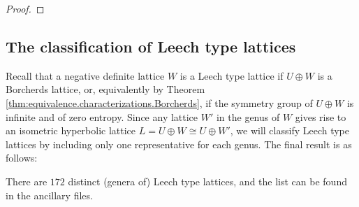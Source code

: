 \documentclass[11pt,letterpaper]{amsart}
\newcommand{\vect}[1]{\boldsymbol{#1}}
\begin{document}
\begin{proof}
\end{proof}

\subsection{The classification of Leech type lattices}

Recall that a negative definite lattice $W$ is a Leech type lattice if $U\oplus W$ is a Borcherds lattice, or, equivalently by Theorem \ref{thm:equivalence.characterizations.Borcherds}, if the symmetry group of $U\oplus W$ is infinite and of zero entropy. Since any lattice $W'$ in the genus of $W$ gives rise to an isometric hyperbolic lattice $L=U\oplus W \cong U\oplus W'$, we will classify Leech type lattices by including only one representative for each genus. The final result is as follows:

\begin{theorem} \label{thm:leech.classification}
There are $172$ distinct (genera of) Leech type lattices, and the list can be found in the ancillary files.
\end{theorem}
\end{document}
